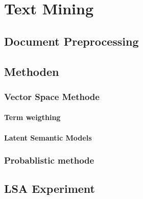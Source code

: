 \chapter{Text Mining}\label{Text Mining}

\section{Document Preprocessing }\label{Document Preprocessing}

\section{Methoden}\label{Methoden}

\subsection{Vector Space Methode}\label{Vector Space Methode}


\subsubsection{Term weigthing}\label{Term weighting}

\subsubsection{Latent Semantic Models}\label{Latent Semantic Models}


\subsection{Probablistic methode}\label{Probablistic methode}

\section{LSA Experiment}\label{LSA Experiment}
